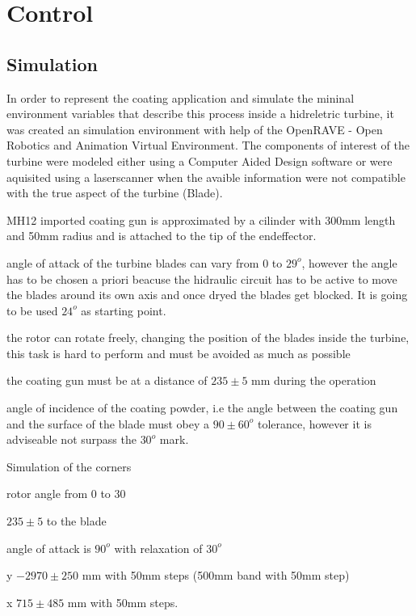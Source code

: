 \section{Control}

\subsection{Simulation}

In order to represent the coating application and simulate the mininal
environment variables that describe this process inside a hidreletric turbine,
it was created an simulation environment with help of the OpenRAVE - Open
Robotics and Animation Virtual Environment. The components of interest of the
turbine were modeled either using a Computer Aided Design software or were
aquisited using a laserscanner when the avaible information were not compatible
with the true aspect of the turbine (Blade).

MH12 imported 
coating gun is approximated by a cilinder with 300mm length and 50mm radius and
is attached to the tip of the endeffector.


angle of attack of the turbine blades can vary from $0$ to $29^o$, however the
angle has to be chosen a priori beacuse the hidraulic circuit has to be active
to move the blades around its own axis and once dryed the blades get blocked.
It is going to be used $24^o$ as starting point.

the rotor can rotate freely, changing the position of the blades inside the
turbine, this task is hard to perform and must be avoided as much as possible

the coating gun must be at a distance of $235\pm 5$ mm during the operation

angle of incidence of the coating powder, i.e the angle between the coating gun
and the surface of the blade must obey a $90\pm 60^o$ tolerance, however it is
adviseable not surpass the $30^o$ mark.

Simulation of the corners

rotor angle from $0$ to $30$

$235\pm 5$ to the blade

angle of attack is $90^o$ with relaxation of $30^o$

y $-2970 \pm 250$ mm with 50mm steps (500mm band with 50mm step)

x $715 \pm 485$ mm with 50mm steps.

